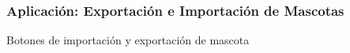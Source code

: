 \documentclass[14pt]{beamer}
\begin{document}
\begin{frame}
\frametitle{Aplicación: Exportación e Importación de Mascotas}
Botones de importación y exportación de mascota
\begin{columns}
\begin{column}{0.5\textwidth}
\begin{center}


\end{center}
\end{column}

\end{columns}

\end{frame}
\end{document}
